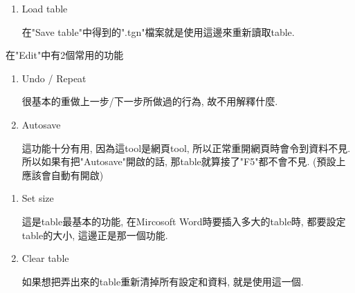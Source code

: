 \begin{enumerate}
{    

  } %

  \item
  {
    Load table

    在"Save table"中得到的".tgn"檔案就是使用這邊來重新讀取table.
  } %
  \end{enumerate}

\newpage
{}

  在"Edit"中有2個常用的功能


  \begin{enumerate}

  \item
  {
    Undo / Repeat

    很基本的重做上一步/下一步所做過的行為, 故不用解釋什麼.
  } %

  \item
  {
    Autosave

    這功能十分有用, 因為這tool是網頁tool, 所以正常重開網頁時會令到資料不見. 所以如果有把"Autosave"開啟的話, 那table就算接了"F5"都不會不見. (預設上應該會自動有開啟)
  } %

  \end{enumerate}

\newpage
{}

  \begin{enumerate}

  \item
  {
    Set size

    這是table最基本的功能, 在Mircosoft Word時要插入多大的table時, 都要設定table的大小, 這邊正是那一個功能.
  } %

  \item
  {
    Clear table

    如果想把弄出來的table重新清掉所有設定和資料, 就是使用這一個.
  } %

  \end{enumerate}

